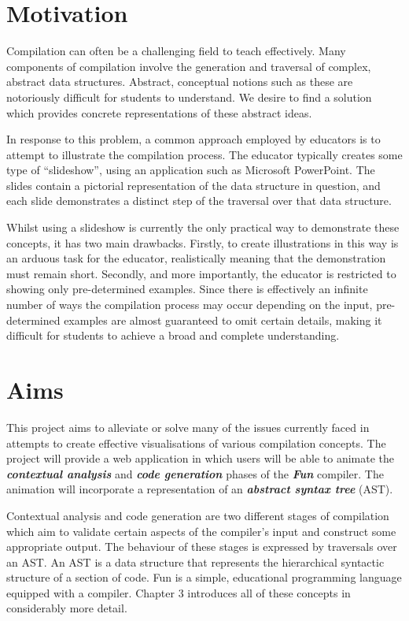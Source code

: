 \documentclass{l4proj}
\begin{document}
\section{Motivation}
Compilation can often be a challenging field to teach effectively. Many components of compilation involve the generation and traversal of complex, abstract data structures. Abstract, conceptual notions such as these are notoriously difficult for students to understand. We desire to find a solution which provides concrete representations of these abstract ideas.

In response to this problem, a common approach employed by educators is to attempt to illustrate the compilation process. The educator typically creates some type of ``slideshow'', using an application such as Microsoft PowerPoint. The slides contain a pictorial representation of the data structure in question, and each slide demonstrates a distinct step of the traversal over that data structure. 

Whilst using a slideshow is currently the only practical way to demonstrate these concepts, it has two main drawbacks. Firstly, to create illustrations in this way is an arduous task for the educator, realistically meaning that the demonstration must remain short. Secondly, and more importantly, the educator is restricted to showing only pre-determined examples. Since there is effectively an infinite number of ways the compilation process may occur depending on the input, pre-determined examples are almost guaranteed to omit certain details, making it difficult for students to achieve a broad and complete understanding.

\section{Aims}
This project aims to alleviate or solve many of the issues currently faced in attempts to create effective visualisations of various compilation concepts. The project will provide a web application in which users will be able to animate the \textit{\textbf{contextual analysis}} and \textit{\textbf{code generation}} phases of the \textit{\textbf{Fun}} compiler. The animation will incorporate a representation of an \textit{\textbf{abstract syntax tree}} (AST). 

Contextual analysis and code generation are two different stages of compilation which aim to validate certain aspects of the compiler's input and construct some appropriate output. The behaviour of these stages is expressed by traversals over an AST. An AST is a data structure that represents the hierarchical syntactic structure of a section of code. Fun is a simple, educational programming language equipped with a compiler. Chapter 3 introduces all of these concepts in considerably more detail. 
\end{document}
